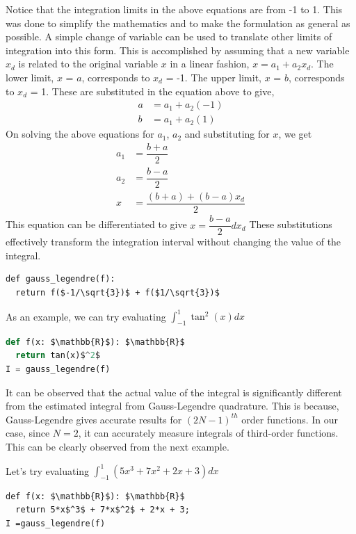 \documentclass[book.tex]{subfiles}
\begin{document}
Notice that the integration limits in the above equations are from -1 to 1. This was done to simplify the mathematics and to make the formulation as general as possible. A simple change of variable can be used to translate other limits of integration into this form. This is accomplished by assuming that a new variable $x_d$ is related to the original variable $x$ in a linear fashion, $ x = a_1 + a_2x_d$.
The lower limit, $x$ = $a$, corresponds to $x_d$ = -1. The upper limit, $x$ = $b$, corresponds to $x_d$ = 1. These are substituted in the equation above to give,
\begin{align}
	a &= a_1 + a_2(-1)\\
	b &= a_1 + a_2(1)
\end{align}
On solving the above equations for $a_1$, $a_2$ and substituting for $x$, we get
\begin{align}
	a_1 &= \dfrac{b+a}{2}\\
	a_2 &= \dfrac{b-a}{2}\\
	x &= \dfrac{(b+a) + (b-a)x_d}{2}
\end{align}
This equation can be differentiated to give $ x = \dfrac{b-a}{2}dx_d$
These substitutions effectively transform the integration interval without changing the value of the integral.

\begin{lstlisting}
def gauss_legendre(f):
  return f($-1/\sqrt{3})$ + f($1/\sqrt{3})$ 
\end{lstlisting}

As an example, we can try evaluating $ \int_{-1}^{1}\tan^2(x)dx$

\begin{lstlisting}[language=python]
def f(x: $\mathbb{R}$): $\mathbb{R}$ 
  return tan(x)$^2$
I = gauss_legendre(f)
\end{lstlisting}
It can be observed that the actual value of the integral is significantly different from the estimated integral from Gauss-Legendre quadrature. This is because, Gauss-Legendre gives accurate results for $(2N-1)^{th}$ order functions. In our case, since $N=2$, it can accurately measure integrals of third-order functions. This can be clearly observed from the next example. 

Let's try
evaluating $ \int_{-1}^{1}(5x^3 + 7x^2 +  2x + 3)dx$

\begin{lstlisting}
def f(x: $\mathbb{R}$): $\mathbb{R}$ 
  return 5*x$^3$ + 7*x$^2$ + 2*x + 3;
I =gauss_legendre(f)
\end{lstlisting}
\end{document}
